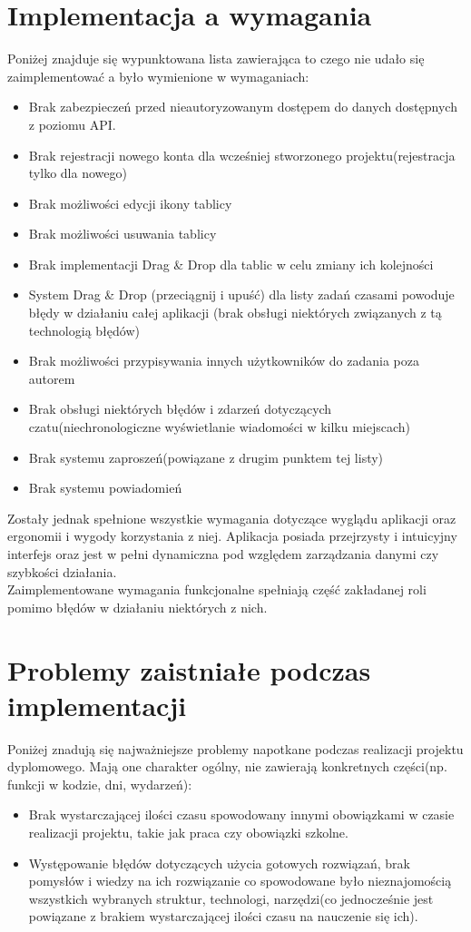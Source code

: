 \documentclass[eng,printmode]{mgr}
\begin{document}
\section{Implementacja a wymagania}
Poniżej znajduje się wypunktowana lista zawierająca to czego nie udało się zaimplementować a było wymienione w wymaganiach:
\begin{itemize}
  \item Brak zabezpieczeń przed nieautoryzowanym dostępem do danych dostępnych z poziomu API.
  \item Brak rejestracji nowego konta dla wcześniej stworzonego projektu(rejestracja tylko dla nowego)
  \item Brak możliwości edycji ikony tablicy
  \item Brak możliwości usuwania tablicy
  \item Brak implementacji Drag \& Drop dla tablic w celu zmiany ich kolejności
  \item System Drag \& Drop (przeciągnij i upuść) dla listy zadań czasami powoduje błędy w działaniu całej aplikacji (brak obsługi niektórych związanych z tą technologią błędów)
  \item Brak możliwości przypisywania innych użytkowników do zadania poza autorem
  \item Brak obsługi niektórych błędów i zdarzeń dotyczących czatu(niechronologiczne wyświetlanie wiadomości w kilku miejscach)
  \item Brak systemu zaproszeń(powiązane z drugim punktem tej listy)
  \item Brak systemu powiadomień
\end{itemize}
Zostały jednak spełnione wszystkie wymagania dotyczące wyglądu aplikacji oraz ergonomii i wygody korzystania z niej. Aplikacja posiada przejrzysty i intuicyjny interfejs oraz jest w pełni dynamiczna pod względem zarządzania danymi czy szybkości działania. \\
Zaimplementowane wymagania funkcjonalne spełniają część zakładanej roli pomimo błędów w działaniu niektórych z nich.

\section{Problemy zaistniałe podczas implementacji}
Poniżej znadują się najważniejsze problemy napotkane podczas realizacji projektu dyplomowego. Mają one charakter ogólny, nie zawierają konkretnych części(np. funkcji w kodzie, dni, wydarzeń):
\begin{itemize}
  \item Brak wystarczającej ilości czasu spowodowany innymi obowiązkami w czasie realizacji projektu, takie jak praca czy obowiązki szkolne.
  \item Występowanie błędów dotyczących użycia gotowych rozwiązań, brak pomysłów i wiedzy na ich rozwiązanie co spowodowane było nieznajomością wszystkich wybranych struktur, technologi, narzędzi(co jednocześnie jest powiązane z brakiem wystarczającej ilości czasu na nauczenie się ich).
\end{itemize}
\end{document}
